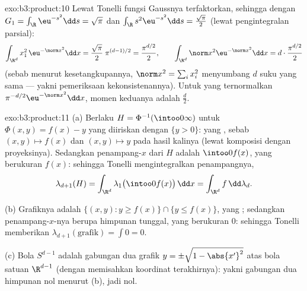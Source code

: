 \begin{solution}{exo:b3:product:10}
Lewat Tonelli fungsi Gaussnya terfaktorkan, sehingga dengan $G_1 =
\int_\R\eu^{-s^2}\dd s = \sqrt\pi$ dan $\int_\R
s^2\eu^{-s^2}\dd s = \frac{\sqrt\pi}2$ (lewat pengintegralan parsial):
\[
\int_{\R^d}x_1^2\,\eu^{-\norm x^2}\dd x =
\frac{\sqrt\pi}2\;\pi^{(d-1)/2} = \frac{\pi^{d/2}}2,
\qquad
\int_{\R^d}\norm x^2\eu^{-\norm x^2}\dd x =
d\cdot\frac{\pi^{d/2}}2
\]
(sebab menurut kesetangkupannya, $\norm x^2 = \sum_ix_i^2$ menyumbang $d$ suku
yang sama --- yakni pemeriksaan kekonsistenannya). Untuk  yang ternormalkan
$\pi^{-d/2}\eu^{-\norm x^2}\dd x$, momen keduanya adalah
$\frac d2$.
\end{solution}

\begin{solution}{exo:b3:product:11}
(a) Berlaku $H = \Phi^{-1}(\intoo0\infty)$ untuk $\Phi(x, y) = f(x) -
y$ yang diiriskan dengan $\{y > 0\}$: yang , sebab $(x, y)
\mapsto f(x)$ dan $(x,y)\mapsto y$  pada
hasil kalinya (lewat komposisi dengan proyeksinya). Sedangkan
penampang-$x$ dari $H$ adalah $\intoo0{f(x)}$, yang berukuran $f(x)$:
sehingga Tonelli mengintegralkan penampangnya,
\[
\lambda_{d+1}(H) = \int_{\R^d}\lambda_1\bigl(\intoo0{f(x)}
\bigr)\,\dd x = \int_{\R^d}f\,\dd\lambda_d .
\]

(b) Grafiknya adalah $\{(x,y) : y \geq f(x)\} \cap \{y \leq
f(x)\}$, yang ; sedangkan penampang-$x$-nya berupa himpunan tunggal, yang
berukuran $0$: sehingga Tonelli memberikan $\lambda_{d+1}(\text{grafik}) =
\int 0 = 0$.

(c) Bola $S^{d-1}$ adalah gabungan dua grafik $y =
\pm\sqrt{1 - \abs{x'}^2}$ atas bola satuan $\R^{d-1}$
(dengan memisahkan koordinat terakhirnya): yakni gabungan dua himpunan nol menurut
(b), jadi nol.
\end{solution}

